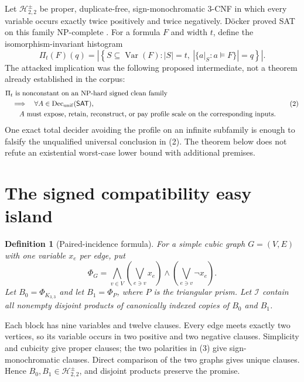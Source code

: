 \documentclass[11pt]{article}
\newtheorem{definition}{Definition}
\newcommand{\SAT}{\mathsf{SAT}}
\begin{document}
Let $\mathcal H^{\pm}_{2,2}$ be proper, duplicate-free, sign-monochromatic
3-CNF in which every variable occurs exactly twice positively and twice
negatively.  D\"ocker proved SAT on this family NP-complete \cite{Docker19}.
For a formula $F$ and width $t$, define the isomorphism-invariant histogram
\[
 \Pi_t(F)(q)=\left|\left\{S\subseteq\operatorname{Var}(F):|S|=t,
 \ \left|\{a|_S:a\models F\}\right|=q\right\}\right| . \tag{1}
\]
The attacked implication was the following proposed intermediate, not a
theorem already established in the corpus:
\[
 \begin{split}
 &\Pi_t\text{ is nonconstant on an NP-hard signed clean family}\\
 &\quad\Longrightarrow\quad
 \forall A\in\operatorname{Dec}_{\rm unif}(\SAT),\\
 &\qquad\text{$A$ must expose, retain, reconstruct, or pay profile scale
 on the corresponding inputs.}
 \end{split} \tag{2}
\]
One exact total decider avoiding the profile on an infinite subfamily is
enough to falsify the unqualified universal conclusion in (2).  The theorem
below does not refute an existential worst-case lower bound with additional
premises.

\section{The signed compatibility easy island}

\begin{definition}[Paired-incidence formula]
For a simple cubic graph $G=(V,E)$ with one variable $x_e$ per edge, put
\[
 \Phi_G=\bigwedge_{v\in V}\left(
   \bigvee_{e\ni v}x_e\right)\wedge
   \left(\bigvee_{e\ni v}\neg x_e\right). \tag{3}
\]
Let $B_0=\Phi_{K_{3,3}}$ and let $B_1=\Phi_P$, where $P$ is the triangular
prism.  Let $\mathcal I$ contain all nonempty disjoint products of canonically
indexed copies of $B_0$ and $B_1$.
\end{definition}

Each block has nine variables and twelve clauses.  Every edge meets exactly
two vertices, so its variable occurs in two positive and two negative clauses.
Simplicity and cubicity give proper clauses; the two polarities in (3) give
sign-monochromatic clauses.  Direct comparison of the two graphs gives unique
clauses.  Hence $B_0,B_1\in\mathcal H^{\pm}_{2,2}$, and disjoint products
preserve the promise.
\end{document}
